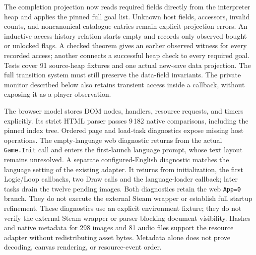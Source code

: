 \documentclass[11pt,a4paper]{article}
\numberwithin{equation}{section}
\theoremstyle{definition}
\theoremstyle{remark}
\begin{document}
The completion projection now reads required fields directly from the interpreter heap and applies the pinned full goal list. Unknown host fields, accessors, invalid counts, and noncanonical catalogue entries remain explicit projection errors. An inductive access-history relation starts empty and records only observed bought or unlocked flags. A checked theorem gives an earlier observed witness for every recorded access; another connects a successful heap check to every required goal. Tests cover 91 source-heap fixtures and one actual new-save data projection. The full transition system must still preserve the data-field invariants. The private monitor described below also retains transient access inside a callback, without exposing it as a player observation.

The browser model stores DOM nodes, handlers, resource requests, and timers explicitly. Its strict HTML parser passes 9\,182 native comparisons, including the pinned index tree. Ordered page and load-task diagnostics expose missing host operations. The empty-language web diagnostic returns from the actual \texttt{Game.Init} call and enters the first-launch language prompt, whose text layout remains unresolved. A separate configured-English diagnostic matches the language setting of the existing adapter. It returns from initialization, the first Logic/Loop callbacks, two Draw calls and the language-loader callback; later tasks drain the twelve pending images. Both diagnostics retain the web \texttt{App=0} branch. They do not execute the external Steam wrapper or establish full startup refinement. These diagnostics use an explicit environment fixture; they do not verify the external Steam wrapper or parser-blocking document visibility. Hashes and native metadata for 298 images and 81 audio files support the resource adapter without redistributing asset bytes. Metadata alone does not prove decoding, canvas rendering, or resource-event order.
\end{document}
